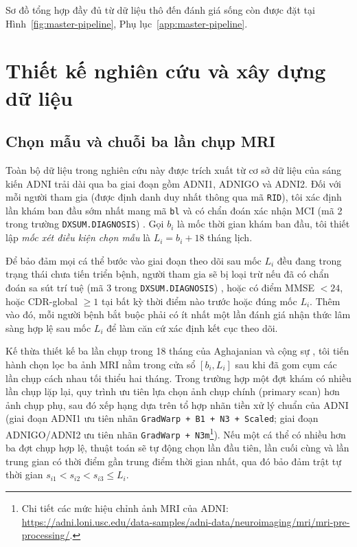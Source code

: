 Sơ đồ tổng hợp đầy đủ từ dữ liệu thô đến đánh giá sống còn được đặt tại Hình~\ref{fig:master-pipeline}, Phụ lục~\ref{app:master-pipeline}.

\section{Thiết kế nghiên cứu và xây dựng dữ liệu}
\label{sec:study-design}

\subsection{Chọn mẫu và chuỗi ba lần chụp MRI}
Toàn bộ dữ liệu trong nghiên cứu này được trích xuất từ cơ sở dữ liệu của sáng kiến ADNI \cite{weiner2015impact,jack2008adnimri} trải dài qua ba giai đoạn gồm ADNI1, ADNIGO và ADNI2. Đối với mỗi người tham gia (được định danh duy nhất thông qua mã \texttt{RID}), tôi xác định lần khám ban đầu sớm nhất mang mã \texttt{bl} và có chẩn đoán xác nhận MCI (mã 2 trong trường \texttt{DXSUM.DIAGNOSIS}) \cite{adnidxsum}. Gọi $b_i$ là mốc thời gian khám ban đầu, tôi thiết lập \emph{mốc xét điều kiện chọn mẫu} là $L_i = b_i + 18$ tháng lịch.

Để bảo đảm mọi cá thể bước vào giai đoạn theo dõi sau mốc $L_i$ đều đang trong trạng thái chưa tiến triển bệnh, người tham gia sẽ bị loại trừ nếu đã có chẩn đoán sa sút trí tuệ (mã 3 trong \texttt{DXSUM.DIAGNOSIS}) \cite{adnidxsum}, hoặc có điểm MMSE $<24$, hoặc CDR-global $\geq 1$ tại bất kỳ thời điểm nào trước hoặc đúng mốc $L_i$. Thêm vào đó, mỗi người bệnh bắt buộc phải có ít nhất một lần đánh giá nhận thức lâm sàng hợp lệ sau mốc $L_i$ để làm căn cứ xác định kết cục theo dõi.

Kế thừa thiết kế ba lần chụp trong 18 tháng của Aghajanian và cộng sự \cite{aghajanian2025longitudinal}, tôi tiến hành chọn lọc ba ảnh MRI nằm trong cửa sổ $[b_i, L_i]$ sau khi đã gom cụm các lần chụp cách nhau tối thiểu hai tháng. Trong trường hợp một đợt khám có nhiều lần chụp lặp lại, quy trình ưu tiên lựa chọn ảnh chụp chính (primary scan) hơn ảnh chụp phụ, sau đó xếp hạng dựa trên tổ hợp nhãn tiền xử lý chuẩn của ADNI (giai đoạn ADNI1 ưu tiên nhãn \texttt{GradWarp + B1 + N3 + Scaled}; giai đoạn ADNIGO/ADNI2 ưu tiên nhãn \texttt{GradWarp + N3m}\footnote{Chi tiết các mức hiệu chỉnh ảnh MRI của ADNI: \url{https://adni.loni.usc.edu/data-samples/adni-data/neuroimaging/mri/mri-pre-processing/}.}). Nếu một cá thể có nhiều hơn ba đợt chụp hợp lệ, thuật toán sẽ tự động chọn lần đầu tiên, lần cuối cùng và lần trung gian có thời điểm gần trung điểm thời gian nhất, qua đó bảo đảm trật tự thời gian $s_{i1} < s_{i2} < s_{i3} \leq L_i$.

